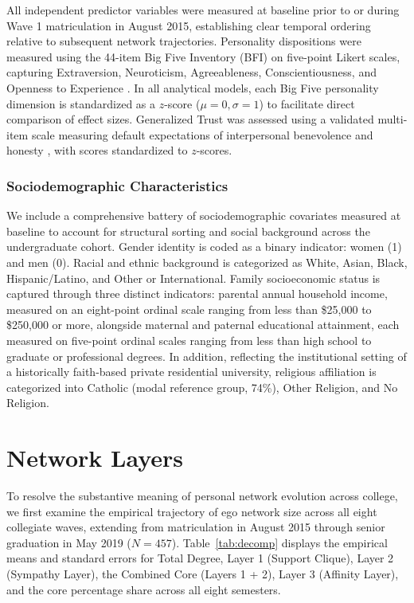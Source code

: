 \documentclass[12pt]{article}
\begin{document}
All independent predictor variables were measured at baseline prior to or during Wave 1 matriculation in August 2015, establishing clear temporal ordering relative to subsequent network trajectories. Personality dispositions were measured using the 44-item Big Five Inventory (BFI) on five-point Likert scales, capturing Extraversion, Neuroticism, Agreeableness, Conscientiousness, and Openness to Experience \citep{john1999big}. In all analytical models, each Big Five personality dimension is standardized as a $z$-score ($\mu = 0, \sigma = 1$) to facilitate direct comparison of effect sizes. Generalized Trust was assessed using a validated multi-item scale measuring default expectations of interpersonal benevolence and honesty \citep{yamagishi2011trust}, with scores standardized to $z$-scores.

\subsubsection{Sociodemographic Characteristics}

We include a comprehensive battery of sociodemographic covariates measured at baseline to account for structural sorting and social background across the undergraduate cohort. Gender identity is coded as a binary indicator: women (1) and men (0). Racial and ethnic background is categorized as White, Asian, Black, Hispanic/Latino, and Other or International. Family socioeconomic status is captured through three distinct indicators: parental annual household income, measured on an eight-point ordinal scale ranging from less than \$25,000 to \$250,000 or more, alongside maternal and paternal educational attainment, each measured on five-point ordinal scales ranging from less than high school to graduate or professional degrees. In addition, reflecting the institutional setting of a historically faith-based private residential university, religious affiliation is categorized into Catholic (modal reference group, 74\%), Other Religion, and No Religion.

\section{Network Layers}

To resolve the substantive meaning of personal network evolution across college, we first examine the empirical trajectory of ego network size across all eight collegiate waves, extending from matriculation in August 2015 through senior graduation in May 2019 ($N = 457$). Table~\ref{tab:decomp} displays the empirical means and standard errors for Total Degree, Layer 1 (Support Clique), Layer 2 (Sympathy Layer), the Combined Core (Layers 1 + 2), Layer 3 (Affinity Layer), and the core percentage share across all eight semesters.
\end{document}
